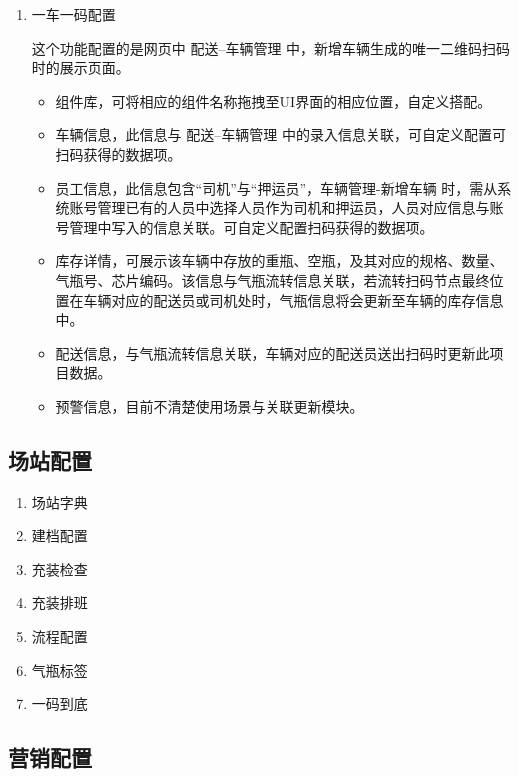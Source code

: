 \documentclass[UTF8]{ctexart}
\begin{document}
\begin{enumerate}
	
	\item 一车一码配置
	
	这个功能配置的是网页中 配送--车辆管理 中，新增车辆生成的唯一二维码扫码时的展示页面。
	\begin{itemize}
		\item 组件库，可将相应的组件名称拖拽至UI界面的相应位置，自定义搭配。
		\item 车辆信息，此信息与 配送--车辆管理 中的录入信息关联，可自定义配置可扫码获得的数据项。
		\item 员工信息，此信息包含“司机”与“押运员”，车辆管理-新增车辆 时，需从系统账号管理已有的人员中选择人员作为司机和押运员，人员对应信息与账号管理中写入的信息关联。可自定义配置扫码获得的数据项。
		\item 库存详情，可展示该车辆中存放的重瓶、空瓶，及其对应的规格、数量、气瓶号、芯片编码。该信息与气瓶流转信息关联，若流转扫码节点最终位置在车辆对应的配送员或司机处时，气瓶信息将会更新至车辆的库存信息中。
		\item 配送信息，与气瓶流转信息关联，车辆对应的配送员送出扫码时更新此项目数据。
		\item 预警信息，目前不清楚使用场景与关联更新模块。
	\end{itemize}
	
	
\end{enumerate}


\subsection{场站配置}

\begin{enumerate}
	\item 场站字典
	
	\item 建档配置
	
	\item 充装检查
	
	\item 充装排班
	
	\item 流程配置
	
	\item 气瓶标签
	
	\item 一码到底
	
	
	
\end{enumerate}


\subsection{营销配置}
\end{document}
